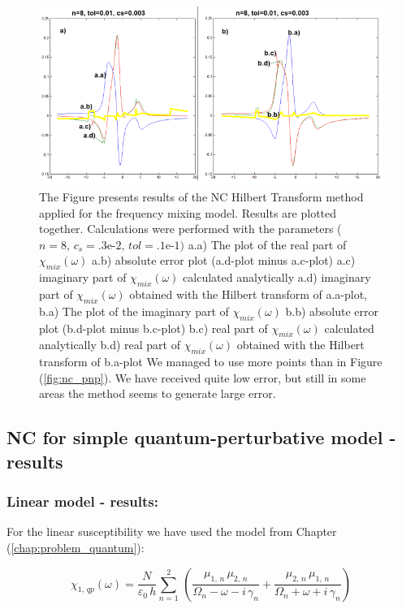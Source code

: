 \documentclass[12pt,twoside,a4paper]{article}
\numberwithin{equation}{subsection}
\numberwithin{figure}{subsection}
\begin{document}
\begin{figure} 
  \includegraphics[width=150mm]{img/nc_fmix1.png}
  \caption{ The Figure presents results of the NC Hilbert Transform method applied for the frequency mixing model. Results are plotted together. Calculations were performed with the parameters ($n = 8, \, c_s = \mbox{.3e-2}, \, tol = \mbox{.1e-1})$
     a.a) The plot of the real part of ${\chi_{mix}}(\omega )$
     a.b) absolute error plot (a.d-plot minus a.c-plot) 
     a.c) imaginary part of ${\chi_{mix}}(\omega )$ calculated analytically 
     a.d) imaginary part of ${\chi_{mix}}(\omega )$ obtained with the Hilbert transform of a.a-plot, 
     b.a) The plot of the imaginary part of ${\chi_{mix}}(\omega )$ 
     b.b) absolute error plot (b.d-plot minus b.c-plot) 
     b.c) real part of $\chi_{mix} (\omega )$ calculated analytically 
     b.d) real part of ${\chi_{mix}}(\omega )$ obtained with the Hilbert transform of b.a-plot
     We managed to use more points than in Figure (\ref{fig:nc_pnp}). We have received quite low error, but still in some areas the method seems to generate large error.
     \label{fig:nc_fmix1}
     }
\end{figure}

\subsection{NC for simple quantum-perturbative model - results} \label{chap:nc_quantum}

\subsubsection*{Linear model - results:}

For the linear susceptibility we have used the model from Chapter (\ref{chap:problem_quantum}): 

\begin{equation} \label{eq:nclin_chipp}
  \chi_{1, \, qp}(\omega ) = \frac {N}{\varepsilon_0 \, h} \sum_{n=1}^{2} \, 
    ( \frac {{\mu_{1, \,n}} \, { \mu_{2, \, n}}}
            {{\Omega_{n}} - \omega  - i \, {\gamma_{n}}} 
    + \frac {{\mu_{2, \,n}}\,{\mu_{1, \,n}}}
            {{\Omega_{n}} + \omega + i \, {\gamma_{n}}} )
\end{equation}
\end{document}
